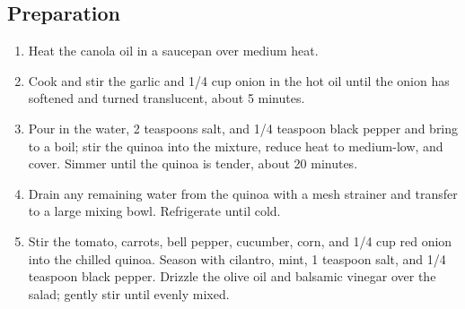 \subsection{Preparation}
\begin{enumerate}
    \item Heat the canola oil in a saucepan over medium heat.
    \item Cook and stir the garlic and 1/4 cup onion in the hot oil until the onion has softened and turned translucent, about 5 minutes.
    \item Pour in the water, 2 teaspoons salt, and 1/4 teaspoon black pepper and bring to a boil; stir the quinoa into the mixture, reduce heat to medium-low, and cover. Simmer until the quinoa is tender, about 20 minutes.
    \item Drain any remaining water from the quinoa with a mesh strainer and transfer to a large mixing bowl. Refrigerate until cold.
    \item Stir the tomato, carrots, bell pepper, cucumber, corn, and 1/4 cup red onion into the chilled quinoa. Season with cilantro, mint, 1 teaspoon salt, and 1/4 teaspoon black pepper. Drizzle the olive oil and balsamic vinegar over the salad; gently stir until evenly mixed.

\end{enumerate}
